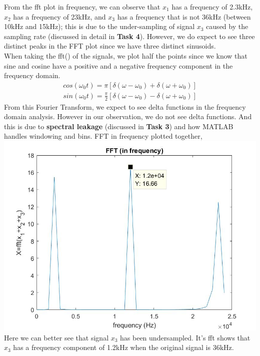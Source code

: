 \documentclass{article}
\begin{document}
        From the fft plot in frequency, we can observe that $x_1$ has a frequency of 2.3kHz, $x_2$ has a frequency of 23kHz, and $x_3$ has a frequency that is not 36kHz (between 10kHz and 15kHz); this is due to the under-sampling of signal $x_3$ caused by the sampling rate (discussed in detail in \textbf{Task 4}). However, we do expect to see three distinct peaks in the FFT plot since we have three distinct sinusoids.\\
        \vspace{5mm}
        When taking the fft() of the signals, we plot half the points since we know that sine and cosine have a positive and a negative frequency component in the frequency domain.
        \begin{align*}
            cos(\omega_0 t)=\pi[\delta(\omega-\omega_0)+\delta(\omega+\omega_0)]\\
            sin(\omega_0 t)=\frac{\pi}{2}[\delta(\omega-\omega_0)-\delta(\omega+\omega_0)]
        \end{align*}
        From this Fourier Transform, we expect to see delta functions in the frequency domain analysis. However in our observation, we do not see delta functions. And this is due to \textbf{spectral leakage} (discussed in \textbf{Task 3}) and how MATLAB handles windowing and bins.
        \newpage
        FFT in frequency plotted together,
        \includegraphics[width=\textwidth]{task2.jpg}
        Here we can better see that signal $x_3$ has been undersampled. It's fft shows that $x_3$ has a frequency component of 1.2kHz when the original signal is 36kHz.
\end{document}
